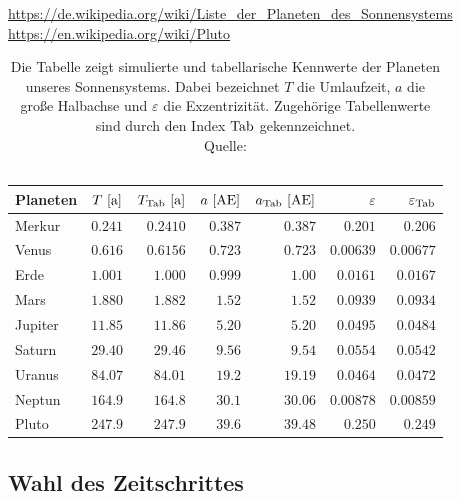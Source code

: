     \urldef{\solarsystemdata}\url{https://de.wikipedia.org/wiki/Liste_der_Planeten_des_Sonnensystems}
    \urldef{\plutodata}\url{https://en.wikipedia.org/wiki/Pluto}
    \begin{table}[h]
      \center
      \caption{Die Tabelle zeigt simulierte und tabellarische Kennwerte der Planeten unseres Sonnensystems. Dabei bezeichnet $T$ die Umlaufzeit, $a$ die große Halbachse und $\varepsilon$ die Exzentrizität. Zugehörige Tabellenwerte sind durch den Index $\mathrm{Tab}$ gekennzeichnet. \\ Quelle: \\ \solarsystemdata \\ \plutodata}
      \label{tab:solarsystem}
      \renewcommand{\arraystretch}{1.5}
      \begin{tabular}{l|rr|rr|rr}
        \hline
        Planeten & $T \ [\m{a}]$ & $T_\m{Tab}\ [\m{a}]$ & $a \ [\m{AE}]$ & $a_\m{Tab} \ [\m{AE}]$ & $\varepsilon$ & $\varepsilon_{\mathrm{Tab}}$ \\
        \hline
        \hline
        Merkur & $0.241$ & $0.2410$ & $0.387$ & $0.387$ & $0.201$ & $0.206$ \\
        Venus & $0.616$ & $0.6156$ & $0.723$ & $0.723$ & $0.00639$ & $0.00677$ \\
        Erde & $1.001$ & $1.000$ & $0.999$ & $1.00$ & $0.0161$ & $0.0167$ \\
        Mars & $1.880$ & $1.882$ & $1.52$ & $1.52$ & $0.0939$ & $0.0934$ \\
        Jupiter & $11.85$ & $11.86$ & $5.20$ & $5.20$ & $0.0495$ & $0.0484$ \\
        Saturn & $29.40$ & $29.46$ & $9.56$ & $9.54$ & $0.0554$ & $0.0542$ \\
        Uranus & $84.07$ & $84.01$ & $19.2$ & $19.19$ & $0.0464$ & $0.0472$ \\
        Neptun & $164.9$ & $164.8$ & $30.1$ & $30.06$ & $0.00878$ & $0.00859$ \\
        Pluto & $247.9$ & $247.9$ & $39.6$ & $39.48$ & $0.250$ & $0.249$ \\
        \hline
        \hline
      \end{tabular}
    \end{table}


  \subsection{Wahl des Zeitschrittes} %
  \label{sub:wahl_des_zeitschrittes}

